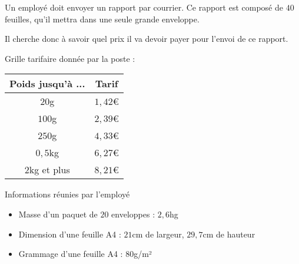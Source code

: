 \documentclass[10pt]{automatisme}
\begin{document}
\begin{frame}
	Un employé doit envoyer un rapport par courrier. Ce rapport est composé de $40$ feuilles, qu'il mettra dans une seule grande enveloppe.

	Il cherche donc à savoir quel prix il va devoir payer pour l'envoi de ce rapport. \bigskip

	\begin{minipage}{0.45\textwidth}
		Grille tarifaire donnée par la poste :
		\begin{center}
			\begin{tabular}{|c|c|}
				\hline
				Poids jusqu'à ... & Tarif   \\ \hline
				$20$g             & $1,42$€ \\ \hline
				$100$g            & $2,39$€ \\ \hline
				$250$g            & $4,33$€ \\ \hline
				$0,5$kg           & $6,27$€ \\ \hline
				$2$kg et plus     & $8,21$€ \\ \hline
			\end{tabular}
		\end{center}
	\end{minipage}\hspace{0.015\textwidth}\vrule\hspace{0.015\textwidth}
	\begin{minipage}{0.45\textwidth}
		Informations réunies par l'employé
		\begin{center}
			\begin{itemize}
				\item Masse d'un paquet de $20$ enveloppes : $2,6$hg
				\item Dimension d'une feuille A4 : $21$cm de largeur, $29,7$cm de hauteur
				\item Grammage d’une feuille A4 : $80$g/m²
			\end{itemize}
		\end{center}
	\end{minipage}
\end{frame}
\end{document}
